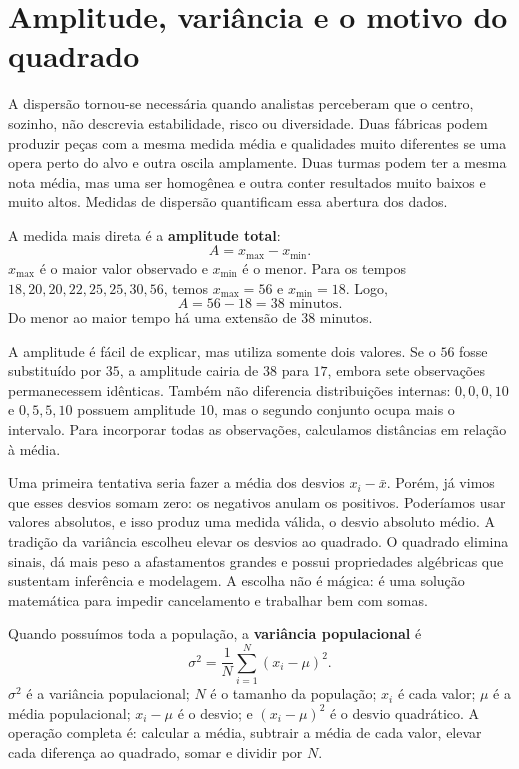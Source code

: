 \section{Amplitude, variância e o motivo do quadrado}

A dispersão tornou-se necessária quando analistas perceberam que o centro, sozinho, não descrevia estabilidade, risco ou diversidade. Duas fábricas podem produzir peças com a mesma medida média e qualidades muito diferentes se uma opera perto do alvo e outra oscila amplamente. Duas turmas podem ter a mesma nota média, mas uma ser homogênea e outra conter resultados muito baixos e muito altos. Medidas de dispersão quantificam essa abertura dos dados.

A medida mais direta é a \textbf{amplitude total}:
\[
A=x_{\max}-x_{\min}.
\]
$x_{\max}$ é o maior valor observado e $x_{\min}$ é o menor. Para os tempos ${18,20,20,22,25,25,30,56}$, temos $x_{\max}=56$ e $x_{\min}=18$. Logo,
\[
A=56-18=38\text{ minutos}.
\]
Do menor ao maior tempo há uma extensão de $38$ minutos.

A amplitude é fácil de explicar, mas utiliza somente dois valores. Se o $56$ fosse substituído por $35$, a amplitude cairia de $38$ para $17$, embora sete observações permanecessem idênticas. Também não diferencia distribuições internas: ${0,0,0,10}$ e ${0,5,5,10}$ possuem amplitude $10$, mas o segundo conjunto ocupa mais o intervalo. Para incorporar todas as observações, calculamos distâncias em relação à média.

Uma primeira tentativa seria fazer a média dos desvios $x_i-\bar{x}$. Porém, já vimos que esses desvios somam zero: os negativos anulam os positivos. Poderíamos usar valores absolutos, e isso produz uma medida válida, o desvio absoluto médio. A tradição da variância escolheu elevar os desvios ao quadrado. O quadrado elimina sinais, dá mais peso a afastamentos grandes e possui propriedades algébricas que sustentam inferência e modelagem. A escolha não é mágica: é uma solução matemática para impedir cancelamento e trabalhar bem com somas.

Quando possuímos toda a população, a \textbf{variância populacional} é
\[
\sigma^2=\frac{1}{N}\sum_{i=1}^{N}(x_i-\mu)^2.
\]
$\sigma^2$ é a variância populacional; $N$ é o tamanho da população; $x_i$ é cada valor; $\mu$ é a média populacional; $x_i-\mu$ é o desvio; e $(x_i-\mu)^2$ é o desvio quadrático. A operação completa é: calcular a média, subtrair a média de cada valor, elevar cada diferença ao quadrado, somar e dividir por $N$.

